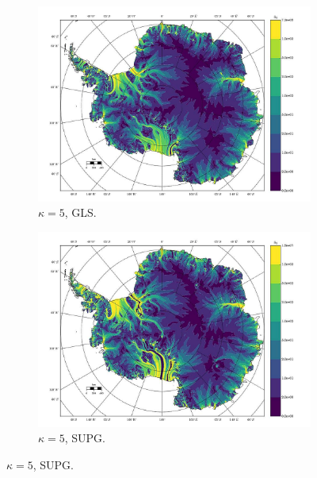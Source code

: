 \begin{figure}
  \begin{subfigure}[b]{0.45\linewidth}
    \includegraphics[width=\linewidth]{images/balance_velocity/antarctica/d_gS_m_U/Ubar_10H_kappa_5_GLS.jpg}
  \caption{$\kappa = 5$, GLS.}
  \label{antarctica_bv_image_d_gS_m_U_kappa_5_GLS}
  \end{subfigure}
  \begin{subfigure}[b]{0.45\linewidth}
    \includegraphics[width=\linewidth]{images/balance_velocity/antarctica/d_gS_m_U/Ubar_10H_kappa_5_SUPG.jpg}
  \caption{$\kappa = 5$, SUPG.}
  \label{antarctica_bv_image_d_gS_m_U_kappa_5_SUPG}
  \end{subfigure}


\end{figure}
